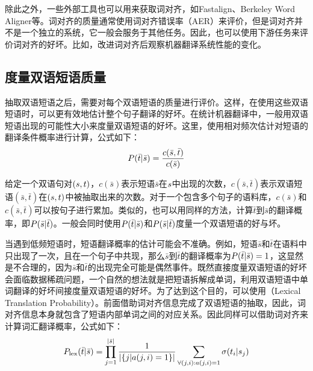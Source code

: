 \parinterval 除此之外，一些外部工具也可以用来获取词对齐，如Fastalign、Berkeley Word Aligner等。词对齐的质量通常使用词对齐错误率（AER）来评价，但是词对齐并不是一个独立的系统，它一般会服务于其他任务。因此，也可以使用下游任务来评价词对齐的好坏。比如，改进词对齐后观察机器翻译系统性能的变化。


\subsection{度量双语短语质量}

\parinterval 抽取双语短语之后，需要对每个双语短语的质量进行评价。这样，在使用这些双语短语时，可以更有效地估计整个句子翻译的好坏。在统计机器翻译中，一般用双语短语出现的可能性大小来度量双语短语的好坏。这里，使用相对频次估计对短语的翻译条件概率进行计算，公式如下：
\begin{eqnarray}
{P}(\bar{t}|\bar{s}) = \frac{c(\bar{s},\bar{t})}{c(\bar{s})}
\label{eq:7-13}
\end{eqnarray}

\parinterval 给定一个双语句对$({s},{t})$，$c(\bar{s})$表示短语$\bar{s}$在${s}$中出现的次数，$c(\bar{s},\bar{t})$表示双语短语$(\bar{s},\bar{t})$在$({s},{t})$中被抽取出来的次数。对于一个包含多个句子的语料库，$c(\bar{s})$和$c(\bar{s},\bar{t})$可以按句子进行累加。类似的，也可以用同样的方法，计算$\bar{t}$到$\bar{s}$的翻译概率，即${P}(\bar{s}|\bar{t})$。一般会同时使用${P}(\bar{t}|\bar{s})$和${P}(\bar{s}|\bar{t})$度量一个双语短语的好与坏。

\parinterval 当遇到低频短语时，短语翻译概率的估计可能会不准确。例如，短语$\bar{s}$和$\bar{t}$在语料中只出现了一次，且在一个句子中共现，那么$\bar{s}$到$\bar{t}$的翻译概率为${P}(\bar{t}|\bar{s})=1$，这显然是不合理的，因为$\bar{s}$和$\bar{t}$的出现完全可能是偶然事件。既然直接度量双语短语的好坏会面临数据稀疏问题，一个自然的想法就是把短语拆解成单词，利用双语短语中单词翻译的好坏间接度量双语短语的好坏。为了达到这个目的，可以使用{\small{}}（Lexical Translation Probability）。前面借助词对齐信息完成了双语短语的抽取，因此，词对齐信息本身就包含了短语内部单词之间的对应关系。因此同样可以借助词对齐来计算词汇翻译概率，公式如下：
\begin{eqnarray}
{P}_{\textrm{lex}}(\bar{t}|\bar{s}) = \prod_{j=1}^{|\bar{s}|} \frac{1}{|\{j|a(j,i) = 1\}|} \sum_{\forall(j,i):a(j,i) = 1} \sigma (t_i|s_j)
\label{eq:7-14}
\end{eqnarray}

